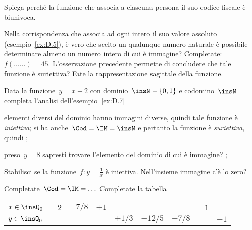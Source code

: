 \begin{esercizio}
 \label{ese:D.6}
Spiega perché la funzione che associa a ciascuna
persona il suo codice fiscale è biunivoca.
\end{esercizio}


\begin{esercizio}
 \label{ese:D.7}
Nella corrispondenza che associa ad ogni intero il suo valore assoluto 
(esempio~\ref{ex:D.5}), è vero che scelto un qualunque numero naturale è
possibile determinare almeno un numero intero di cui è immagine?
Completate:~$f({\ldots}{\ldots}) = 45.$
L'osservazione precedente permette di concludere che
tale funzione è suriettiva?
Fate la rappresentazione sagittale della funzione.
\end{esercizio}

\begin{esercizio}
 \label{ese:D.8}
Data la funzione~$y=x-2$ con dominio~$\insN-\{0,1\}$ e codomino~$\insN$ completa 
l'analisi dell'esempio~\ref{ex:D.7}
\begin{enumeratea}
\item elementi diversi del dominio hanno immagini diverse, quindi tale funzione 
è \emph{iniettiva};
si ha anche~$\Cod=\IM = \insN$ e pertanto la funzione è \emph{suriettiva}, 
quindi \dotfill;
\item preso~$y = 8$ sapresti trovare l'elemento del dominio di cui è immagine? 
\dotfill;
\end{enumeratea}
\end{esercizio}

\begin{esercizio}
 \label{ese:D.9}
Stabilisci se la funzione~$f:y=\frac{1}{x}$ è
iniettiva. Nell'insieme immagine c'è lo zero?

Completate~$\Cod = \IM =\ldots$
Completate la tabella
\begin{center}
\begin{tabular}{l*8{c}}
\toprule
$x\in \insQ_{0}$ & $-2$ & $-7/8$ & $+1$ & & & & $-1$ & \\
$y\in \insQ_{0}$ & & & & $+1/3$ & $-12/5$ & $-7/8$ & & $-1$\\
\bottomrule
\end{tabular}
\end{center}
\end{esercizio}


